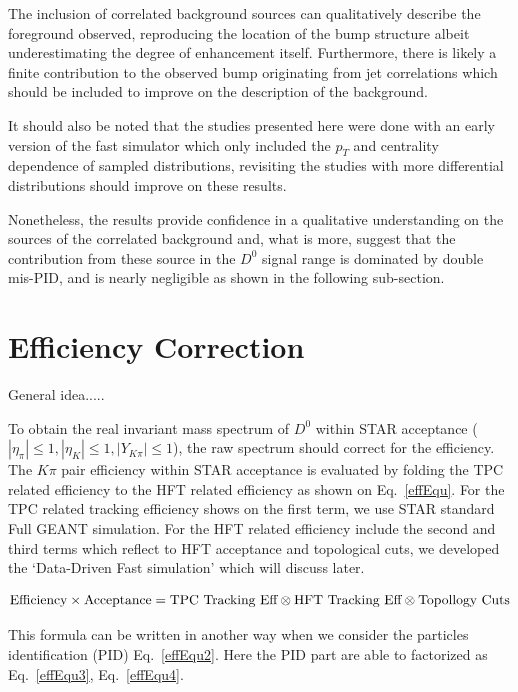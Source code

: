 \documentclass[a4paper]{article}
\begin{document}
The inclusion of correlated background sources can qualitatively describe the foreground observed, reproducing the location of the bump structure albeit underestimating the degree of enhancement itself. Furthermore, there is likely a finite contribution to the observed bump originating from jet correlations which should be included to improve on the description of the background.

It should also be noted that the studies presented here were done with an early version of the fast simulator which only included the $p_T$ and centrality dependence of sampled distributions, revisiting the studies with more differential distributions should improve on these results.

Nonetheless, the results provide confidence in a qualitative understanding on the sources of the correlated background and, what is more, suggest that the contribution from these source in the $D^0$ signal range is dominated by double mis-PID, and is nearly negligible as shown in the following sub-section.


\section{Efficiency Correction}
General idea.....

To obtain the real invariant mass spectrum of $D^0$ within STAR acceptance ($|\eta_{\pi}| \leq 1, |\eta_{K}| \leq 1, |Y_{K\pi}| \leq 1$), the raw spectrum should correct for the efficiency. The $K\pi$ pair efficiency within STAR acceptance is evaluated by folding the TPC related efficiency to the HFT related efficiency as shown on Eq.~\ref{effEqu}. For the TPC related tracking efficiency shows on the first term, we use STAR standard Full GEANT simulation. For the HFT related efficiency include the second and third terms which reflect to HFT acceptance and topological cuts, we developed the `Data-Driven Fast simulation' which will discuss later.

\begin{equation}
  \textup{Efficiency} \times \textup{Acceptance}  = \textup{TPC Tracking Eff} \otimes \textup{HFT Tracking Eff} \otimes \textup{Topollogy Cuts}
\label{effEqu}
\end{equation}

This formula can be written in another way when we consider the particles identification (PID) Eq.~\ref{effEqu2}. Here the PID part are able to factorized as Eq.~\ref{effEqu3}, Eq.~\ref{effEqu4}.
\end{document}
